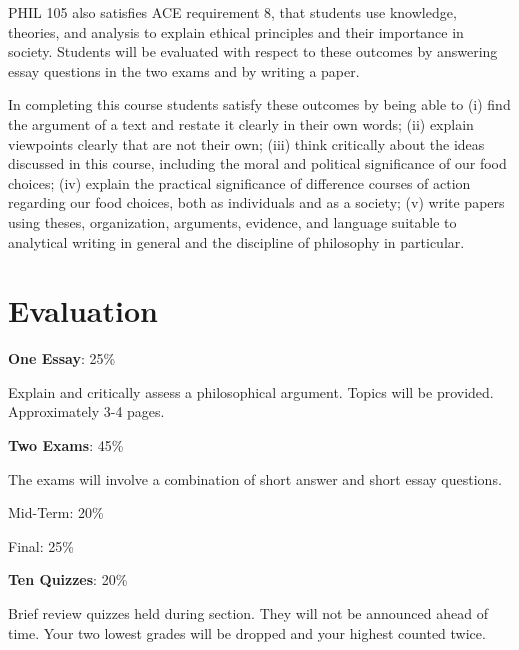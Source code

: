 \documentclass[12pt]{article}
\begin{document}
  PHIL 105 also satisfies ACE requirement 8, that students use knowledge,
  theories, and analysis to explain ethical principles and their importance in
  society. Students will be evaluated with respect to these outcomes by
  answering essay questions in the two exams and by writing a paper.
 
  In completing this course students satisfy these outcomes by being able to (i)
  find the argument of a text and restate it clearly in their own words; (ii)
  explain viewpoints clearly that are not their own; (iii) think critically
  about the ideas discussed in this course, including the moral and political
  significance of our food choices; (iv) explain the practical significance of
  difference courses of action regarding our food choices, both as individuals
  and as a society; (v) write papers using theses, organization, arguments,
  evidence, and language suitable to analytical writing in general and the
  discipline of philosophy in particular.

  \section*{Evaluation}

  \textbf{One Essay}: 25\%
  \begin{itemize*}
  \item Explain and critically assess a philosophical argument. Topics will be provided. Approximately 3-4 pages.
  \end{itemize*}

  \noindent\textbf{Two Exams}: 45\%

  \begin{itemize*}
  \item The exams will involve a combination of short answer and short essay questions.
  \begin{itemize*}
  \item Mid-Term: 20\%
  \item Final: 25\%
  \end{itemize*}
  \end{itemize*}

  \noindent\textbf{Ten Quizzes}: 20\%
  \begin{itemize*}
  \item Brief review quizzes held during section. They will not be announced ahead of time. Your two lowest grades will be dropped and your highest counted twice. 
  \end{itemize*}
\end{document}
